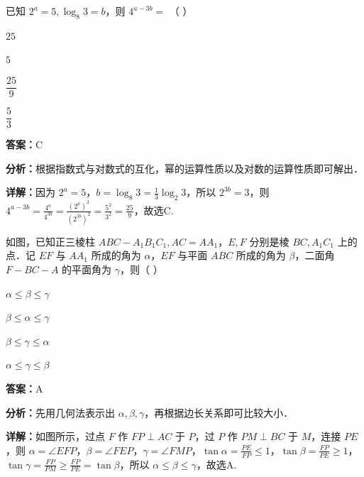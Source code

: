 \begin{question}[points=4]
已知 $2^a = 5, \log_8 3 = b$，则 $4^{a-3b} =$ （ ）
\begin{choices}
  \item $25$
  \item $5$
  \item $\dfrac{25}{9}$
  \item $\dfrac{5}{3}$
\end{choices}
\begin{solution}
\textbf{答案：}C

\textbf{分析：}根据指数式与对数式的互化，幂的运算性质以及对数的运算性质即可解出．

\textbf{详解：}因为 $2^a = 5$，$b = \log_8 3 = \frac{1}{3} \log_2 3$，所以 $2^{3b} = 3$，则 $4^{a-3b} = \frac{4^a}{4^{3b}} = \frac{(2^a)^2}{(2^{3b})^2} = \frac{5^2}{3^2} = \frac{25}{9}$，故选C.
\end{solution}
\end{question}

\begin{question}[points=4]
如图，已知正三棱柱 $ABC-A_1B_1C_1, AC = AA_1$，$E,F$ 分别是棱 $BC, A_1C_1$ 上的点．记 $EF$ 与 $AA_1$ 所成的角为 $\alpha$，$EF$ 与平面 $ABC$ 所成的角为 $\beta$，二面角 $F-BC-A$ 的平面角为 $\gamma$，则（ ）
\begin{choices}
  \item $\alpha \le \beta \le \gamma$
  \item $\beta \le \alpha \le \gamma$
  \item $\beta \le \gamma \le \alpha$
  \item $\alpha \le \gamma \le \beta$
\end{choices}
\begin{solution}
\textbf{答案：}A

\textbf{分析：}先用几何法表示出 $\alpha,\beta,\gamma$，再根据边长关系即可比较大小．

\textbf{详解：}如图所示，过点 $F$ 作 $FP \perp AC$ 于 $P$，过 $P$ 作 $PM \perp BC$ 于 $M$，连接 $PE$，则 $\alpha = \angle EFP$，$\beta = \angle FEP$，$\gamma = \angle FMP$，$\tan\alpha = \frac{PE}{FP} \le 1$，$\tan\beta = \frac{FP}{PE} \ge 1$，$\tan\gamma = \frac{FP}{PM} \ge \frac{FP}{PE} = \tan\beta$，所以 $\alpha \le \beta \le \gamma$，故选A.
\end{solution}
\end{question}

